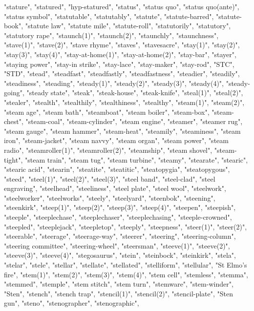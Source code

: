 "stature",
"statured",
"hyp-statured",
"status",
"status quo",
"status quo(ante)",
"status symbol",
"statutable",
"statutably",
"statute",
"statute-barred",
"statute-book",
"statute law",
"statute mile",
"statute-roll",
"statutorily",
"statutory",
"statutory rape",
"staunch(1)",
"staunch(2)",
"staunchly",
"staunchness",
"stave(1)",
"stave(2)",
"stave rhyme",
"staves",
"stavesacre",
"stay(1)",
"stay(2)",
"stay(3)",
"stay(4)",
"stay-at-home(1)",
"stay-at-home(2)",
"stay-bar",
"stayer",
"staying power",
"stay-in strike",
"stay-lace",
"stay-maker",
"stay-rod",
"STC",
"STD",
"stead",
"steadfast",
"steadfastly",
"steadfastness",
"steadier",
"steadily",
"steadiness",
"steading",
"steady(1)",
"steady(2)",
"steady(3)",
"steady(4)",
"steady-going",
"steady state",
"steak",
"steak-house",
"steak-knife",
"steal(1)",
"steal(2)",
"stealer",
"stealth",
"stealthily",
"stealthiness",
"stealthy",
"steam(1)",
"steam(2)",
"steam age",
"steam bath",
"steamboat",
"steam boiler",
"steam-box",
"steam-chest",
"steam-coal",
"steam-cylinder",
"steam engine",
"steamer",
"steamer rug",
"steam gauge",
"steam hammer",
"steam-heat",
"steamily",
"steaminess",
"steam iron",
"steam-jacket",
"steam navvy",
"steam organ",
"steam power",
"steam radio",
"steamroller(1)",
"steamroller(2)",
"steamship",
"steam shovel",
"steam-tight",
"steam train",
"steam tug",
"steam turbine",
"steamy",
"stearate",
"stearic",
"stearic acid",
"stearin",
"steatite",
"steatitic",
"steatopygia",
"steatopygous",
"steed",
"steel(1)",
"steel(2)",
"steel(3)",
"steel band",
"steel-clad",
"steel engraving",
"steelhead",
"steeliness",
"steel plate",
"steel wool",
"steelwork",
"steelworker",
"steelworks",
"steely",
"steelyard",
"steenbok",
"steening",
"steenkirk",
"steep(1)",
"steep(2)",
"steep(3)",
"steep(4)",
"steepen",
"steepish",
"steeple",
"steeplechase",
"steeplechaser",
"steeplechasing",
"steeple-crowned",
"steepled",
"steeplejack",
"steepletop",
"steeply",
"steepness",
"steer(1)",
"steer(2)",
"steerable",
"steerage",
"steerage-way",
"steerer",
"steering",
"steering-column",
"steering committee",
"steering-wheel",
"steersman",
"steeve(1)",
"steeve(2)",
"steeve(3)",
"steeve(4)",
"stegosaurus",
"stein",
"steinbock",
"steinkirk",
"stela",
"stelar",
"stele",
"stellar",
"stellate",
"stellated",
"stelliform",
"stellular",
"St Elmo's fire",
"stem(1)",
"stem(2)",
"stem(3)",
"stem(4)",
"stem cell",
"stemless",
"stemma",
"stemmed",
"stemple",
"stem stitch",
"stem turn",
"stemware",
"stem-winder",
"Sten",
"stench",
"stench trap",
"stencil(1)",
"stencil(2)",
"stencil-plate",
"Sten gun",
"steno",
"stenographer",
"stenographic",
